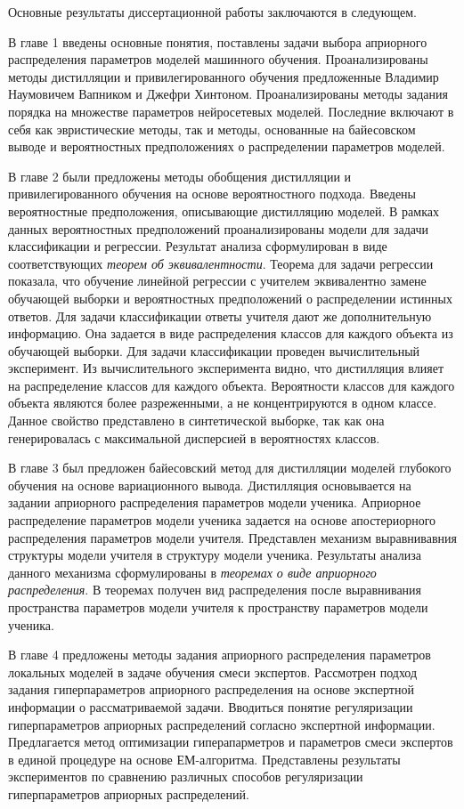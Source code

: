 Основные результаты диссертационной работы заключаются в следующем.

В главе 1 введены основные понятия, поставлены задачи выбора априорного распределения параметров моделей машинного обучения. Проанализированы методы дистилляции и привилегированного обучения предложенные Владимир Наумовичем Вапником и Джефри Хинтоном. Проанализированы методы задания порядка на множестве параметров нейросетевых моделей. Последние включают в себя как эвристические методы, так и методы, основанные на байесовском выводе и вероятностных предположениях о распределении параметров моделей.

В главе 2 были предложены методы обобщения дистилляции и привилегированного обучения на основе вероятностного подхода. Введены вероятностные предположения, описывающие дистилляцию моделей. В рамках данных вероятностных предположений проанализированы модели для задачи классификации и регрессии. Результат анализа сформулирован в виде  соответствующих \emph{теорем об эквивалентности}. Теорема для задачи регрессии показала, что обучение линейной регрессии с учителем эквивалентно замене обучающей выборки и вероятностных предположений о распределении истинных ответов. Для задачи классификации ответы учителя дают же дополнительную информацию. Она задается в виде распределения классов для каждого объекта из обучающей выборки. Для задачи классификации проведен вычислительный эксперимент. Из вычислительного эксперимента видно, что дистилляция влияет на распределение классов для каждого объекта. Вероятности классов для каждого объекта являются более разреженными, а не концентрируются в одном классе. Данное свойство представлено в синтетической выборке, так как она генерировалась с максимальной дисперсией в вероятностях классов.

В главе 3 был предложен байесовский метод для дистилляции моделей глубокого обучения на основе вариационного вывода. Дистилляция основывается на задании априорного распределения параметров модели ученика. Априорное распределение параметров модели ученика задается на основе апостериорного распределения параметров модели учителя. Представлен механизм выравнивавния структуры модели учителя в структуру модели ученика. Результаты анализа данного механизма сформулированы в \emph{теоремах о виде априорного распределения}. В теоремах получен вид распределения после выравнивания пространства параметров модели учителя к пространству параметров модели ученика.

В главе 4 предложены методы задания априорного распределения параметров локальных моделей в задаче обучения смеси экспертов. Рассмотрен подход задания гиперпараметров априорного распределения на основе экспертной информации о рассматриваемой задачи. Вводиться понятие регуляризации гиперпараметров априорных распределений согласно экспертной информации. Предлагается метод оптимизации гиперапарметров и параметров смеси экспертов в единой процедуре на основе ЕМ-алгоритма. Представлены результаты экспериментов по сравнению различных способов регуляризации гиперпараметров априорных распределений.

